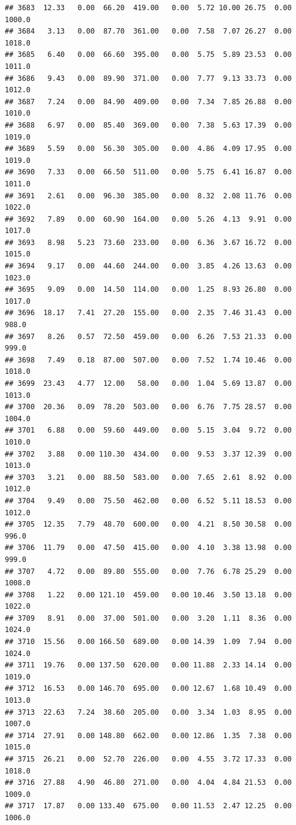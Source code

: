 \documentclass{article}\usepackage{graphicx, color}
\makeatletter
\newenvironment{kframe}{%
 \def\at@end@of@kframe{}%
 \ifinner\ifhmode%
  \def\at@end@of@kframe{\end{minipage}}%
  \begin{minipage}{\columnwidth}%
 \fi\fi%
 \def\FrameCommand##1{\hskip\@totalleftmargin \hskip-\fboxsep
 \colorbox{shadecolor}{##1}\hskip-\fboxsep
     \hskip-\linewidth \hskip-\@totalleftmargin \hskip\columnwidth}%
 \MakeFramed {\advance\hsize-\width
   \@totalleftmargin\z@ \linewidth\hsize
   \@setminipage}}%
 {\par\unskip\endMakeFramed%
 \at@end@of@kframe}
\newenvironment{knitrout}{}{} %
\makeatother
\begin{document}
\begin{knitrout}
\begin{kframe}
\begin{verbatim}
## 3683  12.33   0.00  66.20  419.00   0.00  5.72 10.00 26.75  0.00 1000.0
## 3684   3.13   0.00  87.70  361.00   0.00  7.58  7.07 26.27  0.00 1018.0
## 3685   6.40   0.00  66.60  395.00   0.00  5.75  5.89 23.53  0.00 1011.0
## 3686   9.43   0.00  89.90  371.00   0.00  7.77  9.13 33.73  0.00 1012.0
## 3687   7.24   0.00  84.90  409.00   0.00  7.34  7.85 26.88  0.00 1010.0
## 3688   6.97   0.00  85.40  369.00   0.00  7.38  5.63 17.39  0.00 1019.0
## 3689   5.59   0.00  56.30  305.00   0.00  4.86  4.09 17.95  0.00 1019.0
## 3690   7.33   0.00  66.50  511.00   0.00  5.75  6.41 16.87  0.00 1011.0
## 3691   2.61   0.00  96.30  385.00   0.00  8.32  2.08 11.76  0.00 1022.0
## 3692   7.89   0.00  60.90  164.00   0.00  5.26  4.13  9.91  0.00 1017.0
## 3693   8.98   5.23  73.60  233.00   0.00  6.36  3.67 16.72  0.00 1015.0
## 3694   9.17   0.00  44.60  244.00   0.00  3.85  4.26 13.63  0.00 1023.0
## 3695   9.09   0.00  14.50  114.00   0.00  1.25  8.93 26.80  0.00 1017.0
## 3696  18.17   7.41  27.20  155.00   0.00  2.35  7.46 31.43  0.00  988.0
## 3697   8.26   0.57  72.50  459.00   0.00  6.26  7.53 21.33  0.00  999.0
## 3698   7.49   0.18  87.00  507.00   0.00  7.52  1.74 10.46  0.00 1018.0
## 3699  23.43   4.77  12.00   58.00   0.00  1.04  5.69 13.87  0.00 1013.0
## 3700  20.36   0.09  78.20  503.00   0.00  6.76  7.75 28.57  0.00 1004.0
## 3701   6.88   0.00  59.60  449.00   0.00  5.15  3.04  9.72  0.00 1010.0
## 3702   3.88   0.00 110.30  434.00   0.00  9.53  3.37 12.39  0.00 1013.0
## 3703   3.21   0.00  88.50  583.00   0.00  7.65  2.61  8.92  0.00 1012.0
## 3704   9.49   0.00  75.50  462.00   0.00  6.52  5.11 18.53  0.00 1012.0
## 3705  12.35   7.79  48.70  600.00   0.00  4.21  8.50 30.58  0.00  996.0
## 3706  11.79   0.00  47.50  415.00   0.00  4.10  3.38 13.98  0.00  999.0
## 3707   4.72   0.00  89.80  555.00   0.00  7.76  6.78 25.29  0.00 1008.0
## 3708   1.22   0.00 121.10  459.00   0.00 10.46  3.50 13.18  0.00 1022.0
## 3709   8.91   0.00  37.00  501.00   0.00  3.20  1.11  8.36  0.00 1024.0
## 3710  15.56   0.00 166.50  689.00   0.00 14.39  1.09  7.94  0.00 1024.0
## 3711  19.76   0.00 137.50  620.00   0.00 11.88  2.33 14.14  0.00 1019.0
## 3712  16.53   0.00 146.70  695.00   0.00 12.67  1.68 10.49  0.00 1013.0
## 3713  22.63   7.24  38.60  205.00   0.00  3.34  1.03  8.95  0.00 1007.0
## 3714  27.91   0.00 148.80  662.00   0.00 12.86  1.35  7.38  0.00 1015.0
## 3715  26.21   0.00  52.70  226.00   0.00  4.55  3.72 17.33  0.00 1018.0
## 3716  27.88   4.90  46.80  271.00   0.00  4.04  4.84 21.53  0.00 1009.0
## 3717  17.87   0.00 133.40  675.00   0.00 11.53  2.47 12.25  0.00 1006.0

\end{verbatim}
\end{kframe}
\end{knitrout}
\end{document}
